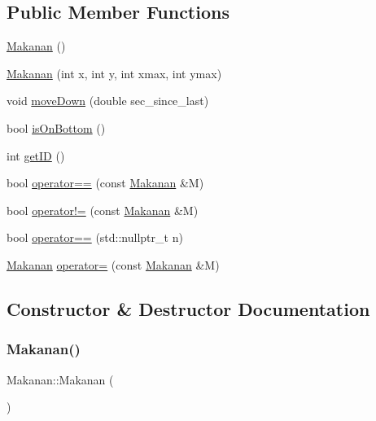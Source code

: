 \subsection*{Public Member Functions}
\begin{DoxyCompactItemize}
\item 
\mbox{\hyperlink{class_makanan_a3123c9b9ca1a63c8334f617934faf634}{Makanan}} ()
\item 
\mbox{\hyperlink{class_makanan_a547f3e22ca69ff229ec25e3117dd96ed}{Makanan}} (int x, int y, int xmax, int ymax)
\item 
void \mbox{\hyperlink{class_makanan_abc0157c0c2133133104de97e1b1a07f0}{move\+Down}} (double sec\+\_\+since\+\_\+last)
\item 
bool \mbox{\hyperlink{class_makanan_a2d5537ee58ca99aed562aebdbb66de48}{is\+On\+Bottom}} ()
\item 
int \mbox{\hyperlink{class_makanan_a0af9a28dae90b5509cfd60e6f3046655}{get\+ID}} ()
\item 
bool \mbox{\hyperlink{class_makanan_aeee966e624eda92eb398f8236a6b914d}{operator==}} (const \mbox{\hyperlink{class_makanan}{Makanan}} \&M)
\item 
bool \mbox{\hyperlink{class_makanan_a832120fa6c5e08529fb3237d257b0d4d}{operator!=}} (const \mbox{\hyperlink{class_makanan}{Makanan}} \&M)
\item 
bool \mbox{\hyperlink{class_makanan_ac256031452bfaebf4b975793bcf6b318}{operator==}} (std\+::nullptr\+\_\+t n)
\item 
\mbox{\hyperlink{class_makanan}{Makanan}} \mbox{\hyperlink{class_makanan_a89a9fa8ab9dc136405f698128d70a7ad}{operator=}} (const \mbox{\hyperlink{class_makanan}{Makanan}} \&M)
\end{DoxyCompactItemize}


\subsection{Constructor \& Destructor Documentation}
\mbox{\label{class_makanan_a3123c9b9ca1a63c8334f617934faf634}} 
\subsubsection{\texorpdfstring{Makanan()}{Makanan()}\hspace{0.1cm}{\footnotesize\ttfamily [1/2]}}
{\footnotesize\ttfamily Makanan\+::\+Makanan (\begin{DoxyParamCaption}{ }\end{DoxyParamCaption})}

